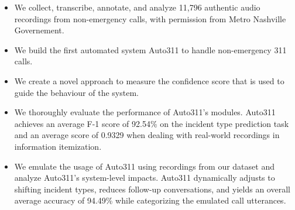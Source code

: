 \begin{itemize}
    \item We collect, transcribe, annotate, and analyze 11,796 authentic audio recordings from non-emergency calls, with permission from Metro Nashville Governement.
    \item We build the first automated system Auto311 to handle non-emergency 311 calls. \item We create a novel approach to measure the confidence score that is used to guide the behaviour of the system.
    \item We thoroughly evaluate the performance of Auto311's modules. Auto311 achieves an average F-1 score of 92.54\% on the incident type prediction task and an average score of 0.9329 when dealing with real-world recordings in information itemization.
    \item We emulate the usage of Auto311 using recordings from our dataset and analyze Auto311's system-level impacts. Auto311 dynamically adjusts to shifting incident types, reduces follow-up conversations, and yields an overall average accuracy of 94.49\% while categorizing the emulated call utterances.
\end{itemize}

